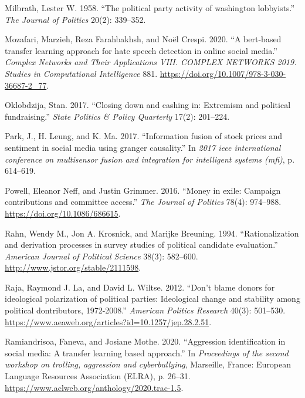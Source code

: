 \documentclass[12pt,]{article}
\begin{document}
\leavevmode\hypertarget{ref-milbrath1958}{}%
Milbrath, Lester W. 1958. ``The political party activity of washington
lobbyists.'' \emph{The Journal of Politics} 20(2): 339--352.

\leavevmode\hypertarget{ref-mozafari2020}{}%
Mozafari, Marzieh, Reza Farahbakhsh, and Noël Crespi. 2020. ``A
bert-based transfer learning approach for hate speech detection in
online social media.'' \emph{Complex Networks and Their Applications
VIII. COMPLEX NETWORKS 2019. Studies in Computational Intelligence} 881.
\url{https://doi.org/10.1007/978-3-030-36687-2_77}.

\leavevmode\hypertarget{ref-oklobdzija2017}{}%
Oklobdzija, Stan. 2017. ``Closing down and cashing in: Extremism and
political fundraising.'' \emph{State Politics \& Policy Quarterly}
17(2): 201--224.

\leavevmode\hypertarget{ref-park2017}{}%
Park, J., H. Leung, and K. Ma. 2017. ``Information fusion of stock
prices and sentiment in social media using granger causality.'' In
\emph{2017 ieee international conference on multisensor fusion and
integration for intelligent systems (mfi)}, p. 614--619.

\leavevmode\hypertarget{ref-powell2016}{}%
Powell, Eleanor Neff, and Justin Grimmer. 2016. ``Money in exile:
Campaign contributions and committee access.'' \emph{The Journal of
Politics} 78(4): 974--988. \url{https://doi.org/10.1086/686615}.

\leavevmode\hypertarget{ref-rahn1994}{}%
Rahn, Wendy M., Jon A. Krosnick, and Marijke Breuning. 1994.
``Rationalization and derivation processes in survey studies of
political candidate evaluation.'' \emph{American Journal of Political
Science} 38(3): 582--600. \url{http://www.jstor.org/stable/2111598}.

\leavevmode\hypertarget{ref-laraja2012}{}%
Raja, Raymond J. La, and David L. Wiltse. 2012. ``Don't blame donors for
ideological polarization of political parties: Ideological change and
stability among political dontributors, 1972-2008.'' \emph{American
Politics Research} 40(3): 501--530.
\url{https://www.aeaweb.org/articles?id=10.1257/jep.28.2.51}.

\leavevmode\hypertarget{ref-ramiandrisoa2020}{}%
Ramiandrisoa, Faneva, and Josiane Mothe. 2020. ``Aggression
identification in social media: A transfer learning based approach.'' In
\emph{Proceedings of the second workshop on trolling, aggression and
cyberbullying}, Marseille, France: European Language Resources
Association (ELRA), p. 26--31.
\url{https://www.aclweb.org/anthology/2020.trac-1.5}.
\end{document}
